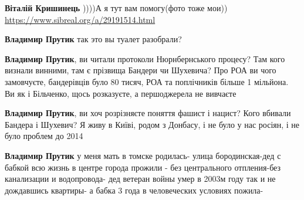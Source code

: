 \begin{itemize}
\begin{itemize}
\textbf{Віталій Кришинець} ))))А я тут вам помогу(фото тоже мои)) \url{https://www.sibreal.org/a/29191514.html}

 
\textbf{Владимир Прутик} так это вы туалет разобрали?

 
\textbf{Владимир Прутик}, ви читали протоколи Нюрнбернського процесу? Там кого визнали винними, там є прізвища Бандери чи Шухевича? Про РОА ви чого замовчуєте, бандерівців було 80 тисяч, РОА та поплічників більше 1 мільйона.
Ви як і Більченко, щось розказуєте, а першоджерела не вивчаєте

 
\textbf{Владимир Прутик}, ви хоч розрізняєте поняття фашист і нацист? Кого вбивали Бандера і Шухевич?
Я живу в Київі, родом з Донбасу, і не було у нас росіян, і не було проблем до 2014

 
\textbf{Владимир Прутик} у меня мать в томске родилась- улица бородинская-дед с бабкой всю жизнь в центре города прожили - без центрального отпления-без канализации и водопровода- дед ветеран войны умер в 2003м году так и не дождавшись квартиры- а бабка 3 года в человеческих условиях пожила-

 

\end{itemize}
\end{itemize}
